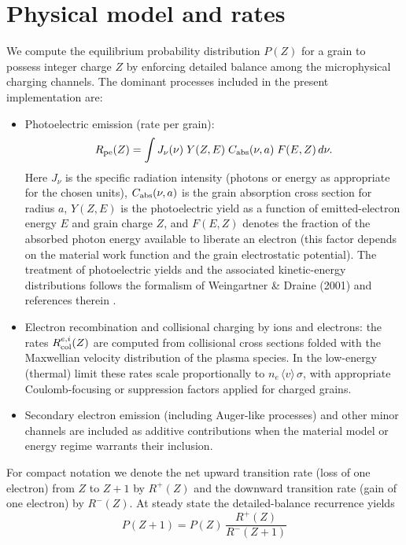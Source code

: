 \documentclass{article}
\begin{document}
\section{Physical model and rates}
We compute the equilibrium probability distribution $P(Z)$ for a grain to
possess integer charge $Z$ by enforcing detailed balance among the
microphysical charging channels. The dominant processes included in the
present implementation are:
\begin{itemize}
  \item Photoelectric emission (rate per grain):
  \begin{equation*}
    R_{\rm pe}(Z) = \int J_{\nu}(\nu)\; Y(Z,E)\; C_{\rm abs}(\nu,a)\; F(E,Z)\,d\nu.
  \end{equation*}
  Here $J_{\nu}$ is the specific radiation intensity (photons or energy as
  appropriate for the chosen units), $C_{\rm abs}(\nu,a)$ is the grain
  absorption cross section for radius $a$, $Y(Z,E)$ is the photoelectric yield
  as a function of emitted-electron energy $E$ and grain charge $Z$, and
  $F(E,Z)$ denotes the fraction of the absorbed photon energy available to
  liberate an electron (this factor depends on the material work function and
  the grain electrostatic potential). The treatment of photoelectric yields
  and the associated kinetic-energy distributions follows the formalism of
  Weingartner & Draine (2001) and references therein \cite{Weingartner2001}.
  \item Electron recombination and collisional charging by ions and electrons:
  the rates $R_{\rm col}^{e,i}(Z)$ are computed from collisional cross
  sections folded with the Maxwellian velocity distribution of the plasma
  species. In the low-energy (thermal) limit these rates scale proportionally
  to $n_{e}\,\langle v\rangle\,\sigma$, with appropriate Coulomb-focusing or
  suppression factors applied for charged grains.
  \item Secondary electron emission (including Auger-like processes) and other
  minor channels are included as additive contributions when the material
  model or energy regime warrants their inclusion.
\end{itemize}

For compact notation we denote the net upward transition rate (loss of one
electron) from $Z$ to $Z+1$ by $R^{+}(Z)$ and the downward transition rate
(gain of one electron) by $R^{-}(Z)$. At steady state the detailed-balance
recurrence yields
\begin{equation}
  P(Z+1) = P(Z)\,\frac{R^{+}(Z)}{R^{-}(Z+1)}
\end{equation}
\end{document}
